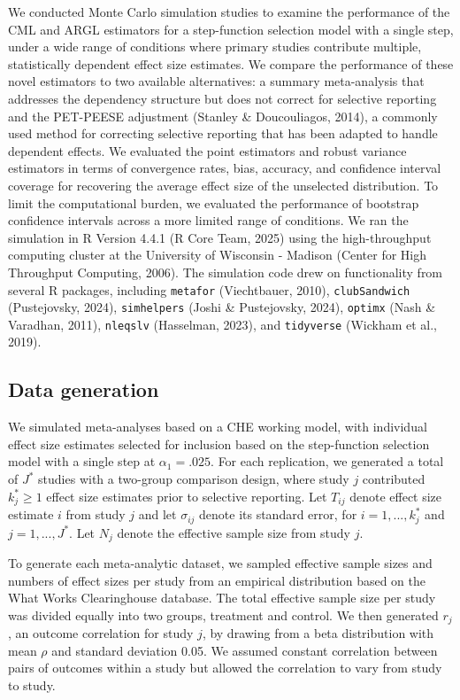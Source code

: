 \documentclass[
  man, donotrepeattitle,floatsintext]{apa7}
\begin{document}
We conducted Monte Carlo simulation studies to examine the performance
of the CML and ARGL estimators for a step-function selection model with a single step, under a wide range of conditions where primary studies contribute multiple, statistically dependent effect size estimates.
We compare the performance of these novel estimators to two available alternatives: a summary meta-analysis that addresses the dependency structure but does not correct for selective reporting and the PET-PEESE adjustment (Stanley \& Doucouliagos, 2014), a commonly used method for correcting selective reporting that has been adapted to handle dependent effects.
We evaluated the point estimators and robust variance estimators in terms of convergence rates, bias, accuracy, and confidence interval coverage for recovering the average effect size of the unselected distribution.
To limit the computational burden, we evaluated the performance of bootstrap confidence intervals across a more limited range of conditions.
We ran the simulation in R Version 4.4.1
(R Core Team, 2025) using the high-throughput computing cluster at the University of Wisconsin - Madison (Center for High Throughput Computing, 2006).
The simulation code drew on functionality from several R packages, including \texttt{metafor} (Viechtbauer, 2010), \texttt{clubSandwich} (Pustejovsky, 2024), \texttt{simhelpers} (Joshi \& Pustejovsky, 2024), \texttt{optimx} (Nash \& Varadhan, 2011), \texttt{nleqslv} (Hasselman, 2023), and \texttt{tidyverse} (Wickham et al., 2019).

\subsection{Data generation}\label{data-generation}

We simulated meta-analyses based on a CHE working model, with individual effect size estimates selected
for inclusion based on the step-function selection model with a single step at \(\alpha_1 = .025\).
For each replication, we generated a total of \(J^*\) studies with a two-group comparison
design, where study \(j\) contributed \(k_j^* \geq 1\) effect size estimates prior to selective reporting. Let
\(T_{ij}\) denote effect size estimate \(i\) from study \(j\) and let \(\sigma_{ij}\)
denote its standard error, for \(i = 1,...,k_j^*\) and \(j = 1,...,J^*\). Let \(N_j\)
denote the effective sample size from study \(j\).

To generate each meta-analytic dataset, we sampled effective sample sizes and numbers of effect sizes per study from an empirical distribution based on the What Works Clearinghouse database.
The total effective sample size per study was divided equally into two groups, treatment and control.
We then generated \(r_j\), an outcome correlation for study \(j\), by drawing from a beta distribution with mean \(\rho\) and standard deviation 0.05.
We assumed constant correlation between pairs of outcomes within a study but allowed the correlation to vary from study to study.
\end{document}
